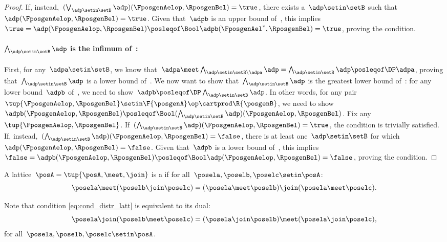 \begin{proof}
    If, instead,~$(\bigvee_{\adp \setin \setB} \adp)(\FposgenAelop,\RposgenBel)=\true$, there exists a~$\adp\setin \setB$ such that~$\adp(\FposgenAelop,\RposgenBel)=\true$.
    Given that~$\adpb$ is an upper bound of~\setB, this implies~$\true=\adp(\FposgenAelop,\RposgenBel)\posleqof\Bool \adpb(\FposgenAel^*,\RposgenBel)=\true$, proving the condition.

    \paragraph*{$\bigwedge_{\adp \setin \setB} \adp$ is the infimum of~\setB:}
    First, for any~$\adpa\setin \setB$, we know that~$\adpa \meet \bigwedge_{\adp \setin \setB \backslash \adpa} \adp= \bigwedge_{\adp \setin \setB} \adp \posleqof\DP \adpa$, proving that~$\bigwedge_{\adp \setin \setB} \adp$ is a lower bound of~\setB.
    We now want to show that~$\bigwedge_{\adp \setin \setB} \adp$ is the greatest lower bound of~\setB: for any lower bound~$\adpb$ of~\setB, we need to show~$\adpb\posleqof\DP\bigwedge_{\adp \setin \setB} \adp $.
    In other words, for any pair~$\tup{\FposgenAelop,\RposgenBel}\setin \F{\posgenA}\op\cartprod \R{\posgenB}$, we need to show~$\adpb(\FposgenAelop,\RposgenBel) \posleqof\Bool (\bigwedge_{\adp \setin \setB} \adp)(\FposgenAelop,\RposgenBel)$.
    Fix any~$\tup{\FposgenAelop,\RposgenBel}$.
    If~$(\bigwedge_{\adp \setin \setB} \adp)(\FposgenAelop,\RposgenBel)=\true$, the condition is trivially satisfied.
    If, instead,~$(\bigwedge_{\adp \setin \setB} \adp)(\FposgenAelop,\RposgenBel)=\false$, there is at least one~$\adp\setin \setB$ for which~$\adp(\FposgenAelop,\RposgenBel)=\false$.
    Given that~$\adpb$ is a lower bound of~\setB, this implies~$\false=\adpb(\FposgenAelop,\RposgenBel)\posleqof\Bool \adp(\FposgenAelop,\RposgenBel)=\false$, proving the condition.
\end{proof}

\begin{definition}
    \label{def:distributive-lattice}
    A lattice~$\posA=\tup{\posA,\meet, \join}$ is a \emph{} if for all~$\posela,\poselb,\poselc\setin \posA$:
    \begin{equation}
        \label{eq:cond_distr_latt}
        \posela \meet (\poselb \join \poselc)=(\posela \meet \poselb)\join (\posela \meet \poselc).
    \end{equation}
\end{definition}
\begin{remark}
    Note that condition \cref{eq:cond_distr_latt} is equivalent to its dual:
    \begin{equation}
        \posela \join (\poselb\meet \poselc)=(\posela \join \poselb)\meet (\posela\join \poselc),
    \end{equation}
    for all~$\posela,\poselb,\poselc\setin \posA$.
\end{remark}

